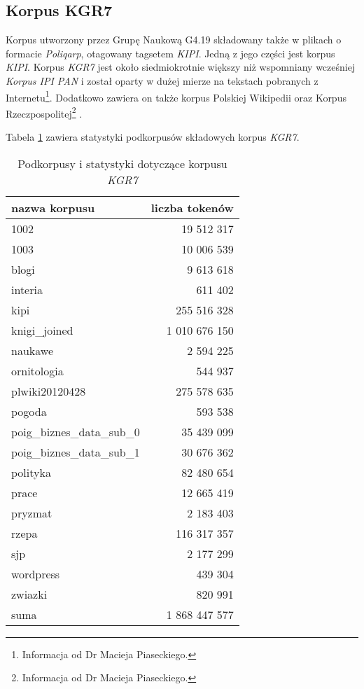 \subsection{Korpus KGR7}
Korpus utworzony przez Grupę Naukową G4.19 składowany także w plikach o formacie \emph{Poliqarp}, otagowany tagsetem \emph{KIPI}.
Jedną z jego części jest korpus \emph{KIPI}.
Korpus \emph{KGR7} jest około siedmiokrotnie większy niż wspomniany wcześniej \emph{Korpus IPI PAN} i został oparty w dużej mierze na tekstach pobranych z Internetu\footnote{Informacja od Dr Macieja Piaseckiego.}.
Dodatkowo zawiera on także korpus Polskiej Wikipedii oraz Korpus Rzeczpospolitej\footnote{Informacja od Dr Macieja Piaseckiego.} \cite{korpus_rzeczpospolitej}.
\par
Tabela \ref{kgr7_stats} zawiera statystyki podkorpusów składowych korpus \emph{KGR7}.
\begin{table}[h!]
\centering
\begin{tabular}{l | r}
	\toprule
	\textbf{nazwa korpusu} & \textbf{liczba tokenów} \\
	\midrule
	1002 & 19 512 317 \\
	1003 & 10 006 539 \\
	blogi & 9 613 618 \\
	interia & 611 402 \\
	kipi & 255 516 328 \\
	knigi\_joined & 1 010 676 150 \\
	naukawe & 2 594 225 \\
	ornitologia & 544 937 \\
	plwiki20120428 & 275 578 635 \\
	pogoda & 593 538 \\
	poig\_biznes\_data\_sub\_0 & 35 439 099 \\
	poig\_biznes\_data\_sub\_1 & 30 676 362 \\
	polityka & 82 480 654 \\
	prace & 12 665 419 \\
	pryzmat & 2 183 403 \\
	rzepa & 116 317 357 \\
	sjp & 2 177 299 \\
	wordpress & 439 304 \\
	zwiazki & 820 991 \\
	\hline
	suma & 1 868 447 577 \\
	\bottomrule
\end{tabular}
\caption[Podkorpusy i statystyki korpusu \emph{KGR7}]{Podkorpusy i statystyki dotyczące korpusu \emph{KGR7}}
\label{kgr7_stats}
\end{table}

